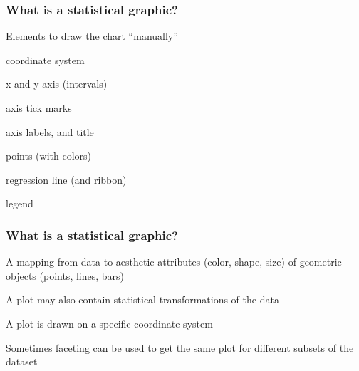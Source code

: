 \documentclass[12pt]{beamer}\usepackage[]{graphicx}\usepackage[]{color}
\begin{document}

\begin{frame}[fragile]
\frametitle{What is a statistical graphic?}

Elements to draw the chart ``manually'' 
\pause

\bbi
  \item coordinate system
  \item x and y axis (intervals)
  \item axis tick marks
  \item axis labels, and title
  \item points (with colors)
  \item regression line (and ribbon)
  \item legend
\ei

\end{frame}


\begin{frame}
\frametitle{What is a statistical graphic?}

\bi
  \item A mapping from data to aesthetic attributes (color, shape, size) of geometric objects (points, lines, bars)
  \item A plot may also contain statistical transformations of the data
  \item A plot is drawn on a specific coordinate system
  \item Sometimes faceting can be used to get the same plot for different subsets of the dataset
\ei
\eb

\end{frame}


\begin{frame}
\begin{center}
\Huge{}
\end{center}
\end{frame}

\end{document}
